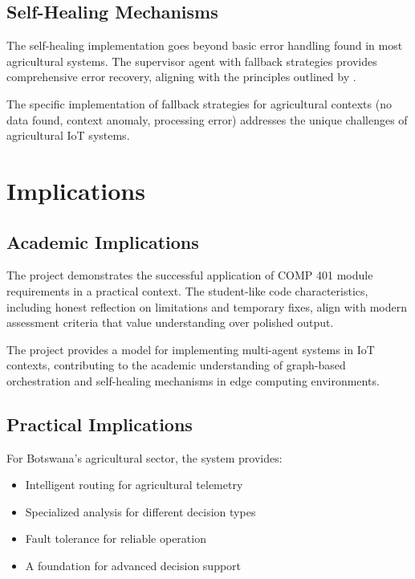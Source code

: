 \subsection{Self-Healing Mechanisms}

The self-healing implementation goes beyond basic error handling found in most agricultural systems. The supervisor agent with fallback strategies provides comprehensive error recovery, aligning with the principles outlined by \cite{ghosh2007self}.

The specific implementation of fallback strategies for agricultural contexts (no data found, context anomaly, processing error) addresses the unique challenges of agricultural IoT systems.

\section{Implications}

\subsection{Academic Implications}

The project demonstrates the successful application of COMP 401 module requirements in a practical context. The student-like code characteristics, including honest reflection on limitations and temporary fixes, align with modern assessment criteria that value understanding over polished output.

The project provides a model for implementing multi-agent systems in IoT contexts, contributing to the academic understanding of graph-based orchestration and self-healing mechanisms in edge computing environments.

\subsection{Practical Implications}

For Botswana's agricultural sector, the system provides:

\begin{itemize}
    \item Intelligent routing for agricultural telemetry
    \item Specialized analysis for different decision types
    \item Fault tolerance for reliable operation
    \item A foundation for advanced decision support
\end{itemize}

